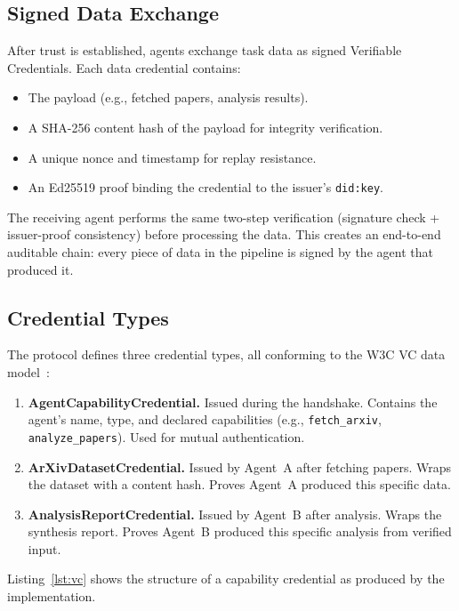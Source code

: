 \documentclass[11pt]{article}
\newcommand{\didkey}{\texttt{did:key}}
\newcommand{\vcs}{Verifiable Credentials}
\begin{document}
\subsection{Signed Data Exchange}

After trust is established, agents exchange task data as signed \vcs{}. Each data credential contains:

\begin{itemize}[nosep,leftmargin=1.5em]
  \item The payload (e.g., fetched papers, analysis results).
  \item A SHA-256 content hash of the payload for integrity verification.
  \item A unique nonce and timestamp for replay resistance.
  \item An Ed25519 proof binding the credential to the issuer's \didkey{}.
\end{itemize}

The receiving agent performs the same two-step verification (signature check + issuer-proof consistency) before processing the data. This creates an end-to-end auditable chain: every piece of data in the pipeline is signed by the agent that produced it.

\subsection{Credential Types}
\label{sec:credentials}

The protocol defines three credential types, all conforming to the W3C VC data model~\cite{w3cvc}:

\begin{enumerate}[nosep,leftmargin=1.5em]
  \item \textbf{AgentCapabilityCredential.} Issued during the handshake. Contains the agent's name, type, and declared capabilities (e.g., \texttt{fetch\_arxiv}, \texttt{analyze\_papers}). Used for mutual authentication.
  \item \textbf{ArXivDatasetCredential.} Issued by Agent~A after fetching papers. Wraps the dataset with a content hash. Proves Agent~A produced this specific data.
  \item \textbf{AnalysisReportCredential.} Issued by Agent~B after analysis. Wraps the synthesis report. Proves Agent~B produced this specific analysis from verified input.
\end{enumerate}

Listing~\ref{lst:vc} shows the structure of a capability credential as produced by the implementation.
\end{document}
